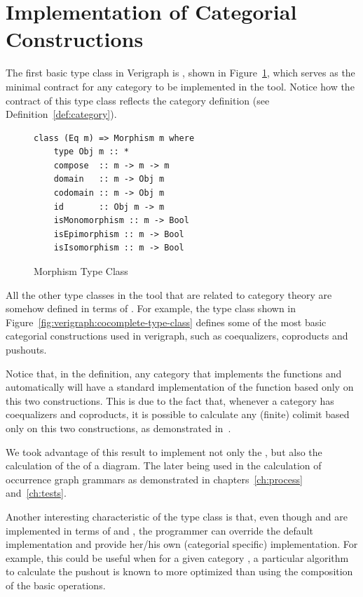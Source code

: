 \section{Implementation of Categorial Constructions}

The first basic type class in Verigraph is , shown in Figure~\ref{fig:verigraph:morphism-type-class}, which serves as the minimal contract for any category to be implemented in the tool. Notice how the contract of this type class reflects the category definition (see Definition~\ref{def:category}).

\begin{figure}[!ht]
\caption{Morphism Type Class}
\begin{verbatim}
class (Eq m) => Morphism m where
    type Obj m :: *
    compose  :: m -> m -> m
    domain   :: m -> Obj m
    codomain :: m -> Obj m
    id       :: Obj m -> m
    isMonomorphism :: m -> Bool
    isEpimorphism :: m -> Bool
    isIsomorphism :: m -> Bool
\end{verbatim}
\label{fig:verigraph:morphism-type-class}
\end{figure}

All the other type classes in the tool that are related to category theory are somehow defined in terms of . For example, the  type class shown in Figure~\ref{fig:verigraph:cocomplete-type-class} defines some of the most basic categorial constructions used in verigraph, such as coequalizers, coproducts and pushouts.

Notice that, in the  definition, any category that implements the functions  and  automatically will have a standard implementation of the  function based only on this two constructions. This is due to the fact that, whenever a category has coequalizers and coproducts, it is possible to calculate any (finite) colimit based only on this two constructions, as demonstrated in~\cite{Pierce1991}.

We took advantage of this result to implement not only the , but also the calculation of the  of a diagram. The later being used in the calculation of occurrence graph grammars as demonstrated in chapters~\ref{ch:process} and~\ref{ch:tests}.

Another interesting characteristic of the  type class is that, even though  and  are implemented in terms of  and , the programmer can override the default implementation and provide her/his own (categorial specific) implementation. For example, this could be useful when for a given category , a particular algorithm to calculate the pushout is known to more optimized than using the composition of the basic operations.

